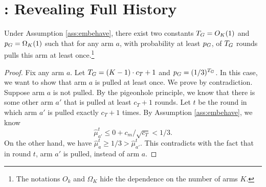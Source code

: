 \section{\ALGG: Revealing Full History}


\begin{lemma}
\label{lem:greedy}
Under Assumption \ref{ass:embehave}, there exist two constants $T_G = O_K(1)$
and $p_G = \Omega_K(1)$ such that for any arm $a$, with probability
at least $p_G$, \ALGG of $T_G$ rounds pulls this arm at least
once.\footnote{The notations $O_k$ and $\Omega_K$ hide the dependence
  on the number of arms $K$.}
\end{lemma}

\begin{proof}
  Fix any arm $a$. Let $T_G = (K-1) \cdot c_T + 1$ and
  $p_G = (1/3)^{T_G}$. 
  In this case, we want to show that arm $a$ is pulled at least
  once. We prove by contradiction. Suppose arm $a$ is not pulled. By
  the pigeonhole principle, we know that there is some other arm $a'$
  that is pulled at least $c_T + 1$ rounds. Let $t$ be the round in
  which arm $a'$ is pulled exactly $c_T + 1$ times. By Assumption
  \ref{ass:embehave}, we know
  \[
    \hat{\mu}_{a'}^t \leq 0 + c_m / \sqrt{c_T} < 1/3. 
  \]
  On the other hand, we have
  $\hat{\mu}_a^t \geq 1/3 > \hat{\mu}_{a'}^t$. This contradicts with
  the fact that in round $t$, arm $a'$ is pulled, instead of arm $a$.
\end{proof}
